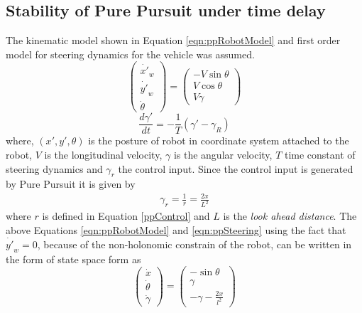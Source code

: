\chapter[ ]{}
\label{appendix_b}
\section{Stability of Pure Pursuit under time delay}
\label{app:ollero}
The kinematic model shown in Equation \ref{eqn:ppRobotModel}  and first order model for steering dynamics for the vehicle was assumed. 
\begin{equation}
\label{eqn:ppRobotModel}
\begin{pmatrix}
\dot{x'}_w\\ \dot{y'}_w\\ \dot{\theta}
\end{pmatrix}
=
\begin{pmatrix}
-V \sin\theta\\ V\cos\theta\\V\gamma
\end{pmatrix}
\end{equation}
\begin{equation}
\label{eqn:ppSteering}
\frac{d\gamma'}{dt}=-\frac{1}{T}(\gamma'-\gamma_R)
\end{equation}
where, $(x',y',\theta)$ is the posture of robot in coordinate system attached to the robot,  $V$  is the longitudinal velocity,  $\gamma$ is the angular velocity, $T$ time constant of steering dynamics and $\gamma_r$ the control input.  Since the control input is generated by Pure Pursuit it is given by
\begin{eqnarray}
\gamma_r=\frac{1}{r}=\frac{2x}{L^2}
\end{eqnarray} 
where $r$ is defined in Equation \ref{ppControl} and $L$ is the \textit{look ahead distance}. The above Equations \ref{eqn:ppRobotModel} and \ref{eqn:ppSteering}  using the fact that $\dot{y'}_w=0$, because of the non-holonomic constrain of the robot, can be written  in the form of state space  form  as 
\begin{equation}
\begin{pmatrix}
\dot{x}\\\dot{\theta}\\\dot{\gamma}
\end{pmatrix}
=
\begin{pmatrix}
-\sin\theta\\ \gamma \\ -\gamma -\frac{2x}{l^2}
\end{pmatrix}
\end{equation}
